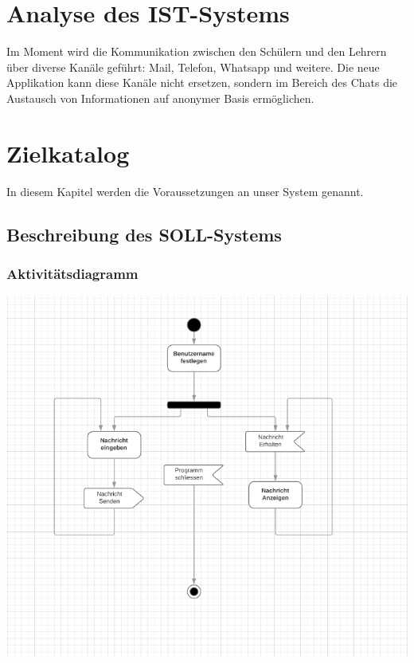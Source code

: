 \documentclass[12pt]{article}
\begin{document}
  \section{Analyse des IST-Systems}
    Im Moment wird die Kommunikation zwischen den Schülern und den Lehrern über diverse Kanäle geführt: Mail, Telefon, Whatsapp und weitere. Die neue Applikation kann diese Kanäle nicht ersetzen, sondern im Bereich des Chats die Austausch von Informationen auf anonymer Basis ermöglichen.

  \section{Zielkatalog}
    In diesem Kapitel werden die Voraussetzungen an unser System genannt.

    \subsection{Beschreibung des SOLL-Systems}
      \subsubsection{Aktivitätsdiagramm}
        \includegraphics[width=\textwidth]{activity-diagram.png}
\end{document}
